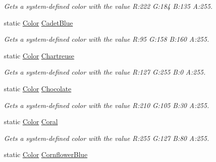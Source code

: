 \begin{DoxyCompactItemize}
\begin{DoxyCompactList}\small\item\em Gets a system-\/defined color with the value R\+:222 G\+:184 B\+:135 A\+:255.\end{DoxyCompactList}\item 
static \hyperlink{structMicrosoft_1_1Xna_1_1Framework_1_1Color}{Color} \hyperlink{structMicrosoft_1_1Xna_1_1Framework_1_1Color_a2db4a95aaa374a93dc04dcd80abbb829}{Cadet\+Blue}
\begin{DoxyCompactList}\small\item\em Gets a system-\/defined color with the value R\+:95 G\+:158 B\+:160 A\+:255.\end{DoxyCompactList}\item 
static \hyperlink{structMicrosoft_1_1Xna_1_1Framework_1_1Color}{Color} \hyperlink{structMicrosoft_1_1Xna_1_1Framework_1_1Color_a3a38f15c273b34ece6cd53740a69adaa}{Chartreuse}
\begin{DoxyCompactList}\small\item\em Gets a system-\/defined color with the value R\+:127 G\+:255 B\+:0 A\+:255.\end{DoxyCompactList}\item 
static \hyperlink{structMicrosoft_1_1Xna_1_1Framework_1_1Color}{Color} \hyperlink{structMicrosoft_1_1Xna_1_1Framework_1_1Color_aef6aca8c50909cac60a9509a31d4cf31}{Chocolate}
\begin{DoxyCompactList}\small\item\em Gets a system-\/defined color with the value R\+:210 G\+:105 B\+:30 A\+:255.\end{DoxyCompactList}\item 
static \hyperlink{structMicrosoft_1_1Xna_1_1Framework_1_1Color}{Color} \hyperlink{structMicrosoft_1_1Xna_1_1Framework_1_1Color_a7ed2d6db43798975ecb31d89024d02c7}{Coral}
\begin{DoxyCompactList}\small\item\em Gets a system-\/defined color with the value R\+:255 G\+:127 B\+:80 A\+:255.\end{DoxyCompactList}\item 
static \hyperlink{structMicrosoft_1_1Xna_1_1Framework_1_1Color}{Color} \hyperlink{structMicrosoft_1_1Xna_1_1Framework_1_1Color_abd16398ca99ec33233fc4ed536bf8037}{Cornflower\+Blue}

\end{DoxyCompactItemize}
